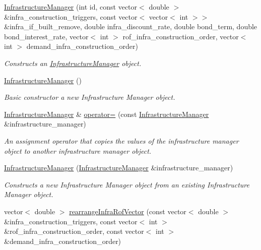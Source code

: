 \begin{DoxyCompactItemize}
\item 
\mbox{\hyperlink{classInfrastructureManager_a2720f467b660e0f63f265e7957ca0139}{Infrastructure\+Manager}} (int id, const vector$<$ double $>$ \&infra\+\_\+construction\+\_\+triggers, const vector$<$ vector$<$ int $>$$>$ \&infra\+\_\+if\+\_\+built\+\_\+remove, double infra\+\_\+discount\+\_\+rate, double bond\+\_\+term, double bond\+\_\+interest\+\_\+rate, vector$<$ int $>$ rof\+\_\+infra\+\_\+construction\+\_\+order, vector$<$ int $>$ demand\+\_\+infra\+\_\+construction\+\_\+order)
\begin{DoxyCompactList}\small\item\em Constructs an \mbox{\hyperlink{classInfrastructureManager}{Infrastructure\+Manager}} object. \end{DoxyCompactList}\item 
\mbox{\hyperlink{classInfrastructureManager_a435ec4cb56238c6e1d93e37783f3a03a}{Infrastructure\+Manager}} ()
\begin{DoxyCompactList}\small\item\em Basic constructor a new Infrastructure Manager object. \end{DoxyCompactList}\item 
\mbox{\hyperlink{classInfrastructureManager}{Infrastructure\+Manager}} \& \mbox{\hyperlink{classInfrastructureManager_ad016a00ca49b1896e94a04f723209a64}{operator=}} (const \mbox{\hyperlink{classInfrastructureManager}{Infrastructure\+Manager}} \&infrastructure\+\_\+manager)
\begin{DoxyCompactList}\small\item\em An assignment operator that copies the values of the infrastructure manager object to another infrastructure manager object. \end{DoxyCompactList}\item 
\mbox{\hyperlink{classInfrastructureManager_a9d1fe6a0325a3705dbfabb92afbe9055}{Infrastructure\+Manager}} (\mbox{\hyperlink{classInfrastructureManager}{Infrastructure\+Manager}} \&infrastructure\+\_\+manager)
\begin{DoxyCompactList}\small\item\em Constructs a new Infrastructure Manager object from an existing Infrastructure Manager object. \end{DoxyCompactList}\item 
vector$<$ double $>$ \mbox{\hyperlink{classInfrastructureManager_a23888a04e8cb5e2fb7a36b2258d4a259}{rearrange\+Infra\+Rof\+Vector}} (const vector$<$ double $>$ \&infra\+\_\+construction\+\_\+triggers, const vector$<$ int $>$ \&rof\+\_\+infra\+\_\+construction\+\_\+order, const vector$<$ int $>$ \&demand\+\_\+infra\+\_\+construction\+\_\+order)
$$
\end{DoxyCompactItemize}
